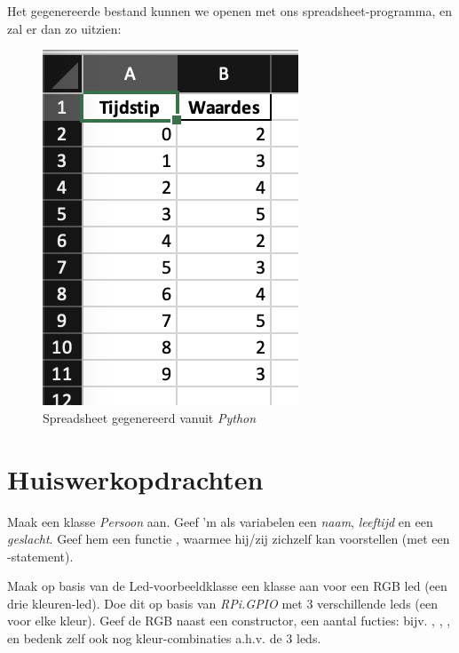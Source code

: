 
Het gegenereerde bestand kunnen we openen met ons spreadsheet-programma, en zal er dan zo uitzien:

\begin{figure}[h!]
\centering\includegraphics[scale=0.7]{Pictures/chapter07/excel2.png}
\caption{Spreadsheet gegenereerd vanuit \textit{Python}}
\label{fig:excel1} %
\end{figure}

\newpage

\section{Huiswerkopdrachten}
\begin{exercise}
Maak een klasse \textit{Persoon} aan. Geef 'm als variabelen een \textit{naam}, \textit{leeftijd} en een \textit{geslacht}. Geef hem een functie , waarmee hij/zij zichzelf kan voorstellen (met een -statement). 
\end{exercise}

\begin{exercise}
Maak op basis van de Led-voorbeeldklasse een klasse aan voor een RGB led (een drie kleuren-led). Doe dit op basis van \textit{RPi.GPIO} met $3$ verschillende leds (een voor elke kleur). Geef de RGB naast een constructor, een aantal fucties: bijv. , , ,  en bedenk zelf ook nog kleur-combinaties a.h.v. de $3$ leds.
\end{exercise}

